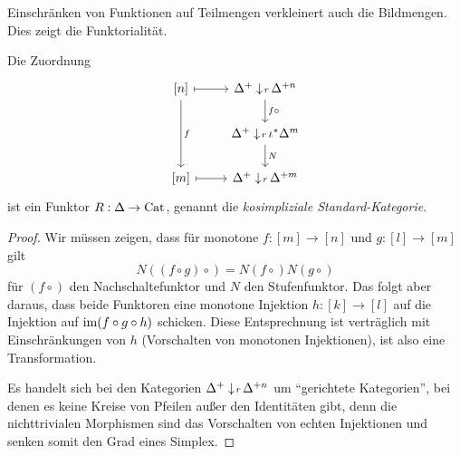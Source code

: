 Einschränken von Funktionen auf Teilmengen verkleinert auch die
Bildmengen. Dies zeigt die Funktorialität.
\begin{prop}
  Die Zuordnung
  \[ \begin{tikzcd}
    {[n]} \arrow{dd}{f} \rar[mapsto]
    & \slicecat{\Delta^+}{r}{\Delta^{+n}} \dar{f \circ} \\
    & \slicecat{\Delta^+}{r}{\iota^* \Delta^m} \dar{N} \\
    {[m]} \rar[mapsto]
    & \slicecat{\Delta^+}{r}{\Delta^{+m}}
  \end{tikzcd} \]
  ist ein Funktor $R: \Delta \to \operatorname{Cat}$, genannt die
  \emph{kosimpliziale Standard-Kategorie}.
\end{prop}
\begin{proof}
  Wir müssen zeigen, dass für monotone $f: [m] \to [n]$ und $g: [l]
  \to [m]$ gilt
  \[ N ((f \circ g)\circ) = N (f \circ) N (g \circ) \]
  für $(f \circ)$ den Nachschaltefunktor und $N$ den
  Stufenfunktor. Das folgt aber daraus, dass beide Funktoren eine
  monotone Injektion $h: [k] \to [l]$ auf die Injektion auf $\operatorname{im} (f
  \circ g \circ h)$ schicken. Diese Entsprechnung ist verträglich mit
  Einschränkungen von $h$ (Vorschalten von monotonen Injektionen), ist
  also eine Transformation.

  Es handelt sich bei den Kategorien
  $\Delta^+ \downarrow \! {\scriptstyle r} \, \Delta^{+n}$ um ``gerichtete Kategorien'',
  bei denen es keine Kreise von Pfeilen außer den Identitäten gibt,
  denn die nichttrivialen Morphismen sind das Vorschalten von echten
  Injektionen und senken somit den Grad eines Simplex.
\end{proof}

